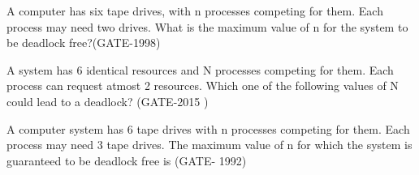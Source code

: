 

\setcounter{question}{0}


\begin{minipage}{\linewidth}

  \question  A computer has six tape drives, with n processes competing for them. Each process may need two drives.
             What is the maximum value of n for the system to be deadlock free?(GATE-1998)

  \begin{oneparchoices}
  \end{oneparchoices}

  \end{minipage}

\vspace{0.08in}


\begin{minipage}{\linewidth}

  \question  A system has 6 identical resources and N processes competing for them. Each process can request atmost 2 resources. Which one of the following values of N could lead to a deadlock? (GATE-2015 )

  \begin{oneparchoices}
  \end{oneparchoices}

  \end{minipage}

\vspace{0.08in}


\begin{minipage}{\linewidth}

  \question  A computer system has 6 tape drives with n processes competing for them. Each process may need 3 tape drives. The maximum value of n for which the system is guaranteed to be deadlock free is (GATE- 1992)

  \begin{oneparchoices}
  \end{oneparchoices}

  \end{minipage}

